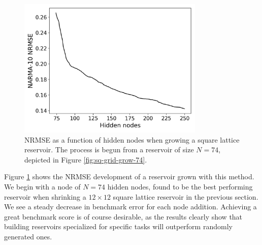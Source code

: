 \begin{figure} \centering
  \includegraphics[width=3.5in]{figures/grow-performance.png}
  \caption{
    NRMSE as a function of hidden nodes when growing a square lattice
reservoir. The process is begun from a reservoir of size $N = 74$, depicted in
Figure \protect\ref{fig:sq-grid-grow-74}.
  }
  \label{fig:sq-grow-performance}
\end{figure}

Figure \ref{fig:sq-grow-performance} shows the NRMSE development of a reservoir
grown with this method. We begin with a node of $N = 74$ hidden nodes, found to
be the best performing reservoir when shrinking a $12 \times 12$ square lattice
reservoir in the previous section. We see a steady decrease in benchmark error
for each node addition. Achieving a great benchmark score is of course
desirable, as the results clearly show that building reservoirs specialized for
specific tasks will outperform randomly generated ones.

